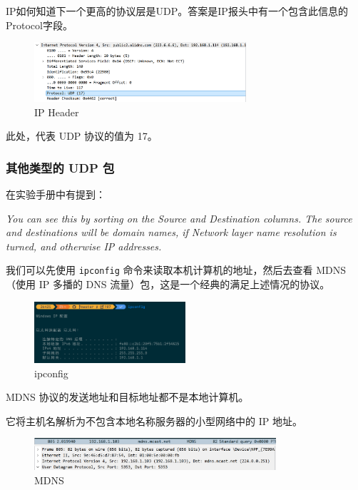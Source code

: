 \documentclass[14pt,a4paper,UTF8,twoside]{article}
\begin{document}
IP如何知道下一个更高的协议层是UDP。答案是IP报头中有一个包含此信息的Protocol字段。

\begin{figure}[H]
    \centering
    \includegraphics[width=0.7\textwidth]{lab5/ip.png}
    \caption{IP Header}
\end{figure}

此处，代表 UDP 协议的值为 17。

\subsubsection{其他类型的 UDP 包}

在实验手册中有提到：

\begin{mdframed}[backgroundcolor=gray!10, linewidth=0.8pt, roundcorner=5pt]
    \textit{You can see this by sorting on the Source and Destination columns. The source and destinations will be domain names, if Network layer name resolution is turned, and otherwise IP addresses.}
\end{mdframed}

我们可以先使用 \texttt{ipconfig} 命令来读取本机计算机的地址，然后去查看 MDNS（使用 IP 多播的 DNS 流量）包，这是一个经典的满足上述情况的协议。

\begin{figure}[H]
    \centering
    \includegraphics[width=0.5\textwidth]{lab5/ipconfig.png}
    \caption{ipconfig}
\end{figure}

MDNS 协议的发送地址和目标地址都不是本地计算机。

它将主机名解析为不包含本地名称服务器的小型网络中的 IP 地址。

\begin{figure}[H]
    \centering
    \includegraphics[width=0.8\textwidth]{lab5/mdns.png}
    \caption{MDNS}
\end{figure}
\end{document}
